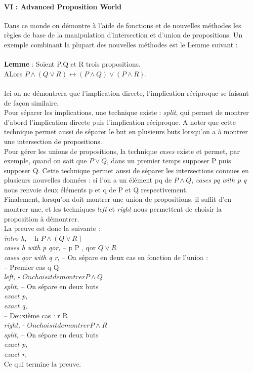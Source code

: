 \documentclass[french,frenchkw]{article}
\begin{document}
\paragraph{VI : Advanced Proposition World}
Dans ce monde on démontre à l'aide de fonctions et de nouvelles méthodes les règles de base de la manipulation d'intersection et d'union de propositions. Un exemple combinant la plupart des nouvelles méthodes est le Lemme suivant : \\
\\
\textbf{Lemme} : Soient P,Q et R trois propositions. \\
ALors $P\land(Q\lor R) \longleftrightarrow (P\land Q)\lor(P\land R)$.\\
\\
Ici on ne démontrera que l'implication directe, l'implication réciproque se faisant de façon similaire.\\
Pour séparer les implications, une technique existe : \textit{split}, qui permet de montrer d'abord l'implication directe puis l'implication réciproque. A noter que cette technique permet aussi de séparer le but en plusieurs buts lorsqu'on a à montrer une intersection de propositions.\\
Pour gérer les unions de propositions, la technique \textit{cases} existe et permet, par exemple, quand on sait que $P\lor Q$, dans un premier temps supposer P puis supposer Q. Cette technique permet aussi de séparer les intersections connues en plusieurs nouvelles données : si l'on a un élément pq de $P\land Q$, \textit{cases pq with p q} nous renvoie deux éléments p et q de P et Q respectivement.\\
Finalement, lorsqu'on doit montrer une union de propositions, il suffit d'en montrer une, et les techniques \textit{left} et \textit{right} nous permettent de choisir la proposition à démontrer.\\
La preuve est donc la suivante : \\

\textit{intro h,}     -- h \in $P\land (Q\lor R)$\\ 
\textit{cases h with p qor,}     -- p \in P , qor \in $Q\lor R$\\
\textit{cases qor with q r,}     -- On sépare en deux cas en fonction de l'union :\\ 

-- Premier cas q \in Q\\
\textit{left,}   - $On choisit de montrer P\land Q$\\
\textit{split,}     -- On sépare en deux buts\\
\textit{exact p,}\\
\textit{exact q,}\\

-- Deuxième cas : r \in R\\
\textit{right,}     - $On choisit de montrer P\land R$\\
\textit{split,}     -- On sépare en deux buts\\
\textit{exact p,}\\
\textit{exact r,}\\
Ce qui termine la preuve.


\end{document}
